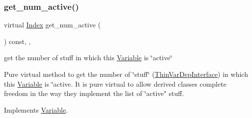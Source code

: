 \mbox{\label{class_s_m_spp__di__unipi__it_1_1_col_variable_aad5c7fae8bf5c960045590272201d88e}} 
\subsubsection{\texorpdfstring{get\+\_\+num\+\_\+active()}{get\_num\_active()}}
{\footnotesize\ttfamily virtual \mbox{\hyperlink{class_s_m_spp__di__unipi__it_1_1_variable_ad53d6229d7ec28555a9c9c2fd9abf773}{Index}} get\+\_\+num\+\_\+active (\begin{DoxyParamCaption}\item[{void}]{ }\end{DoxyParamCaption}) const\hspace{0.3cm}{\ttfamily [inline]}, {\ttfamily [override]}, {\ttfamily [virtual]}}



get the number of stuff in which this \mbox{\hyperlink{class_s_m_spp__di__unipi__it_1_1_variable}{Variable}} is \char`\"{}active\char`\"{} 

Pure virtual method to get the number of \char`\"{}stuff\char`\"{} (\mbox{\hyperlink{class_s_m_spp__di__unipi__it_1_1_thin_var_dep_interface}{Thin\+Var\+Dep\+Interface}}) in which this \mbox{\hyperlink{class_s_m_spp__di__unipi__it_1_1_variable}{Variable}} is \char`\"{}active. It is pure virtual to allow derived
classes complete freedom in the way they implement the list of \char`\"{}active" stuff. 

Implements \mbox{\hyperlink{class_s_m_spp__di__unipi__it_1_1_variable_ad5813b427b1bca3b32f25a97be80c3fe}{Variable}}.

\mbox{\label{class_s_m_spp__di__unipi__it_1_1_col_variable_a39bd7feba71ae3c1d49c43dd27503f18}} 
